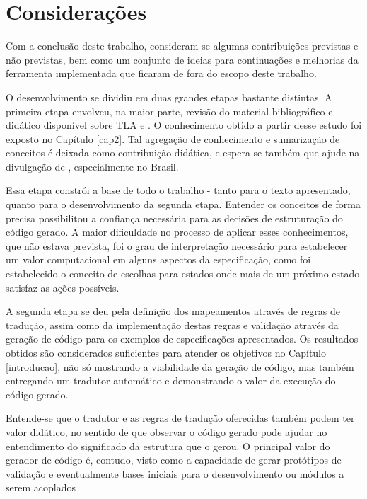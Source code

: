 \chapter{Considerações}


Com a conclusão deste trabalho, consideram-se algumas contribuições previstas e
não previstas, bem como um conjunto de ideias para continuações e melhorias
da ferramenta implementada que ficaram de fora do escopo deste trabalho.

O desenvolvimento se dividiu em duas grandes etapas bastante distintas. A
primeira etapa envolveu, na maior parte, revisão do material bibliográfico e
didático disponível sobre TLA e \TLAA. O conhecimento obtido a partir desse
estudo foi exposto no Capítulo \ref{cap2}. Tal agregação de conhecimento e
sumarização de conceitos é deixada como contribuição didática, e espera-se
também que ajude na divulgação de \TLAA, especialmente no Brasil.

Essa etapa constrói a base de todo o trabalho - tanto para o texto apresentado,
quanto para o desenvolvimento da segunda etapa. Entender os conceitos de forma
precisa possibilitou a confiança necessária para as decisões de estruturação do
código gerado. A maior dificuldade no processo de aplicar esses conhecimentos,
que não estava prevista, foi o grau de interpretação necessário para estabelecer
um valor computacional em alguns aspectos da especificação, como foi
estabelecido o conceito de escolhas para estados onde mais de um próximo estado
satisfaz as ações possíveis.

A segunda etapa se deu pela definição dos mapeamentos através de regras de
tradução, assim como da implementação destas regras e validação através da
geração de código para os exemplos de especificações apresentados. Os resultados
obtidos são considerados suficientes para atender os objetivos no Capítulo
\ref{introducao}, não só mostrando a viabilidade da geração de código, mas
também entregando um tradutor automático e demonstrando o valor da execução do
código gerado.

Entende-se que o tradutor e as regras de tradução oferecidas também podem ter
valor didático, no sentido de que observar o código gerado pode ajudar no
entendimento do significado da estrutura que o gerou. O principal valor do
gerador de código é, contudo, visto como a capacidade de gerar protótipos de
validação e eventualmente bases iniciais para o desenvolvimento ou módulos a
serem acoplados 


